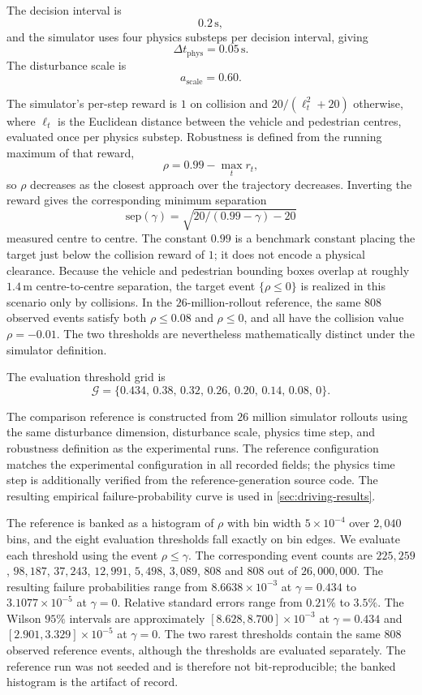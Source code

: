 The decision interval is
\[
    0.2\,\mathrm{s},
\]
and the simulator uses four physics substeps per decision interval, giving
\[
    \Delta t_{\mathrm{phys}}
    =
    0.05\,\mathrm{s}.
\]
The disturbance scale is
\[
    a_{\mathrm{scale}}
    =
    0.60.
\]

The simulator's per-step reward is $1$ on collision and $20/(\ell_t^2+20)$ otherwise, where $\ell_t$ is the Euclidean distance between the vehicle and pedestrian centres, evaluated once per physics substep. Robustness is defined from the running maximum of that reward,
\[
    \rho
    =
    0.99-\max_t r_t,
\]
so $\rho$ decreases as the closest approach over the trajectory decreases. Inverting the reward gives the corresponding minimum separation
\[
    \mathrm{sep}(\gamma)
    =
    \sqrt{20/(0.99-\gamma)-20}
\]
measured centre to centre. The constant $0.99$ is a benchmark constant placing the target just below the collision reward of $1$; it does not encode a physical clearance. Because the vehicle and pedestrian bounding boxes overlap at roughly $1.4\,\mathrm{m}$ centre-to-centre separation, the target event $\{\rho\leq0\}$ is realized in this scenario only by collisions. In the $26$-million-rollout reference, the same $808$ observed events satisfy both $\rho\leq0.08$ and $\rho\leq0$, and all have the collision value $\rho=-0.01$. The two thresholds are nevertheless mathematically distinct under the simulator definition.

The evaluation threshold grid is
\[
    \mathcal G
    =
    \{
        0.434,\,
        0.38,\,
        0.32,\,
        0.26,\,
        0.20,\,
        0.14,\,
        0.08,\,
        0
    \}.
\]

The comparison reference is constructed from $26$ million simulator rollouts using the same disturbance dimension, disturbance scale, physics time step, and robustness definition as the experimental runs. The reference configuration matches the experimental configuration in all recorded fields; the physics time step is additionally verified from the reference-generation source code. The resulting empirical failure-probability curve is used in \cref{sec:driving-results}. 

The reference is banked as a histogram of $\rho$ with bin width $5\times10^{-4}$ over $2{,}040$ bins, and the eight evaluation thresholds fall exactly on bin edges. We evaluate each threshold using the event $\rho\leq\gamma$. The corresponding event counts are $225{,}259$, $98{,}187$, $37{,}243$, $12{,}991$, $5{,}498$, $3{,}089$, $808$ and $808$ out of $26{,}000{,}000$. The resulting failure probabilities range from $8.6638\times10^{-3}$ at $\gamma=0.434$ to $3.1077\times10^{-5}$ at $\gamma=0$. Relative standard errors range from $0.21\%$ to $3.5\%$. The Wilson $95\%$ intervals are approximately $[8.628,8.700]\times10^{-3}$ at $\gamma=0.434$ and $[2.901,3.329]\times10^{-5}$ at $\gamma=0$. The two rarest thresholds contain the same $808$ observed reference events, although the thresholds are evaluated separately. The reference run was not seeded and is therefore not bit-reproducible; the banked histogram is the artifact of record.

